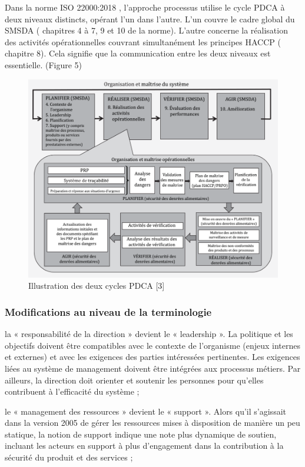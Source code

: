\begin{spacing}{1.2}
Dans la norme ISO 22000:2018 , l’approche processus utilise le cycle PDCA à deux niveaux distincts, opérant l’un dans l’autre. L’un couvre le cadre global du SMSDA ( chapitres 4 à 7, 9 et 10 de la norme). L’autre concerne la réalisation des activités opérationnelles couvrant simultanément les principes HACCP ( chapitre 8). Cela signifie que la communication entre les deux niveaux est essentielle. (Figure 5)


\begin{figure}[!ht]\centering
\includegraphics[scale=5]{image1.png}
\caption{ Illustration des deux cycles PDCA [3]}
\label{fig:fig1}
\end{figure}

\subsubsection{Modifications au niveau de la terminologie}
la « responsabilité de la direction » devient le « leadership ». La politique et les objectifs doivent être compatibles avec le contexte de l’organisme (enjeux internes et externes) et avec les exigences des parties intéressées pertinentes. Les exigences liées au système de management doivent être intégrées aux processus métiers. Par ailleurs, la direction doit orienter et soutenir les personnes pour qu’elles contribuent à l’efficacité du système ;




le « management des ressources » devient le « support ». Alors qu’il s’agissait dans la version 2005 de gérer les ressources mises à disposition de manière un peu statique, la notion de support indique une note plus dynamique de soutien, incluant les acteurs en support à plus d’engagement dans la contribution à la sécurité du produit et des services ;






\end{spacing}
